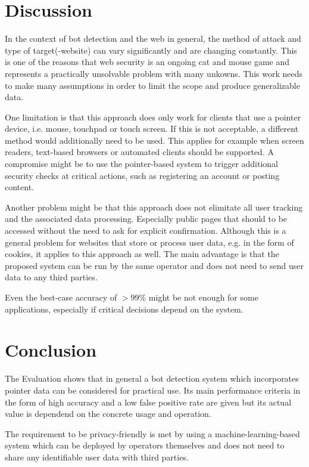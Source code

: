 \documentclass[
    fontsize=12pt,
    headings=small,
    parskip=half,           %
    bibliography=totoc,
    numbers=noenddot,       %
    open=any,               %
    final,                   %
    table
]{scrreprt}
\begin{document}
\chapter{Discussion}
In the context of bot detection and the web in general, the method of attack and type of target(-website) can vary significantly and are changing constantly. This is one of the reasons that web security is an ongoing cat and mouse game and represents a practically unsolvable problem with many unkowns. This work needs to make many assumptions in order to limit the scope and produce generalizable data.

One limitation is that this approach does only work for clients that use a pointer device, i.e. mouse, touchpad or touch screen. If this is not acceptable, a different method would additionally need to be used. This applies for example when screen readers, text-based browsers or automated clients should be supported. A compromise might be to use the pointer-based system to trigger additional security checks at critical actions, such as registering an account or posting content.

Another problem might be that this approach does not elimitate all user tracking and the associated data processing. Especially public pages that should to be accessed without the need to ask for explicit confirmation. Although this is a general problem for websites that store or process user data, e.g. in the form of cookies, it applies to this approach as well. The main advantage is that the proposed system can be run by the same operator and does not need to send user data to any third parties.

Even the best-case accuracy of $>99\%$ might be not enough for some applications, especially if critical decisions depend on the system.

\chapter{Conclusion}

The Evaluation shows that in general a bot detection system which incorporates pointer data can be considered for practical use. Its main performance criteria in the form of high accuracy and a low false positive rate are given but its actual value is dependend on the concrete usage and operation.

The requirement to be privacy-friendly is met by using a machine-learning-based system which can be deployed by operators themselves and does not need to share any identifiable user data with third parties.
\end{document}
